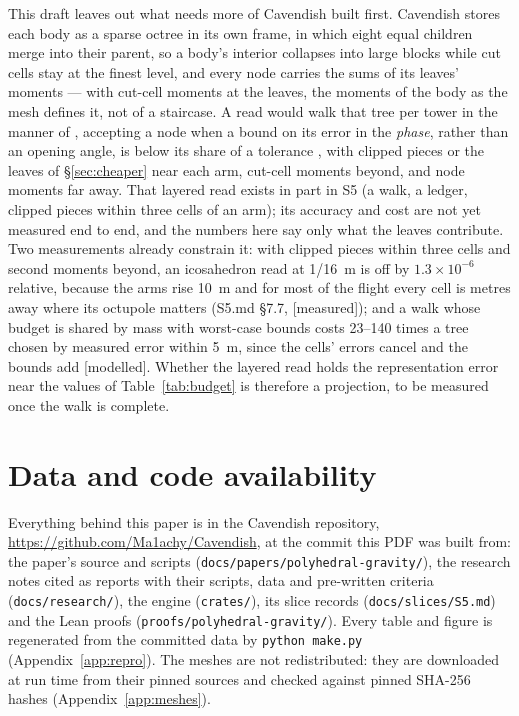 \documentclass[10pt,a4paper]{article}
\newcommand{\tagM}{\textsf{\small[measured]}}
\newcommand{\tagMo}{\textsf{\small[modelled]}}
\newcommand{\cutcell}{cut-cell moments}
\begin{document}
This draft leaves out what needs more of Cavendish built first. Cavendish stores each body as a sparse
octree in its own frame, in which eight equal children merge into their parent, so a body's interior
collapses into large blocks while cut cells stay at the finest level, and every node carries the sums
of its leaves' moments --- with \cutcell{} at the leaves, the moments of the body as the mesh defines
it, not of a staircase. A read would walk that tree per tower in the manner of \citet{barnes1986},
accepting a node when a bound on its error in the \emph{phase}, rather than an opening angle, is below
its share of a tolerance \citep{salmon1994,dehnen2014}, with clipped pieces or the leaves of
\S\ref{sec:cheaper} near each arm, \cutcell{} beyond, and node moments far away. That layered read
exists in part in S5 (a walk, a ledger, clipped pieces within three cells of an arm); its accuracy and
cost are not yet measured end to end, and the numbers here say only what the leaves contribute. Two
measurements already constrain it: with clipped pieces within three cells and second moments beyond, an
icosahedron read at 1/16~m is off by $1.3\times10^{-6}$ relative, because the arms rise 10~m and for
most of the flight every cell is metres away where its octupole matters (S5.md \S7.7, \tagM); and a
walk whose budget is shared by mass with worst-case bounds costs 23--140 times a tree chosen by
measured error within 5~m, since the cells' errors cancel and the bounds add \citep[\S3]{papersurface}
\tagMo. Whether the layered read holds the representation error near the values of
Table~\ref{tab:budget} is therefore a projection, to be measured once the walk is complete.

\section*{Data and code availability}
\sloppy Everything behind this paper is in the Cavendish repository,
\url{https://github.com/Ma1achy/Cavendish}, at the commit this PDF was built from: the paper's source
and scripts (\texttt{docs/papers/polyhedral-gravity/}), the research notes cited as reports
\citep{paperrealread,paperflight,paperbench,paperboxes,papersurface} with their scripts, data and
pre-written criteria (\texttt{docs/research/}), the engine (\texttt{crates/}), its slice records
(\texttt{docs/slices/S5.md}) and the Lean proofs (\texttt{proofs/polyhedral-gravity/}). Every table
and figure is regenerated from the committed data by \texttt{python make.py} (Appendix~\ref{app:repro}).
The meshes are not redistributed: they are downloaded at run time from their pinned sources and
checked against pinned SHA-256 hashes (Appendix~\ref{app:meshes}).\par\fussy
\end{document}
